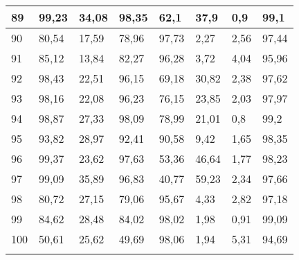 \begin{longtable}[c]{|l|l|l|l|l|l|l|l|}
89              & 99,23        & 34,08        & 98,35       & 62,1          & 37,9          & 0,9           & 99,1          \\ \hline
90              & 80,54        & 17,59        & 78,96       & 97,73         & 2,27          & 2,56          & 97,44         \\ \hline
91              & 85,12        & 13,84        & 82,27       & 96,28         & 3,72          & 4,04          & 95,96         \\ \hline
92              & 98,43        & 22,51        & 96,15       & 69,18         & 30,82         & 2,38          & 97,62         \\ \hline
93              & 98,16        & 22,08        & 96,23       & 76,15         & 23,85         & 2,03          & 97,97         \\ \hline
94              & 98,87        & 27,33        & 98,09       & 78,99         & 21,01         & 0,8           & 99,2          \\ \hline
95              & 93,82        & 28,97        & 92,41       & 90,58         & 9,42          & 1,65          & 98,35         \\ \hline
96              & 99,37        & 23,62        & 97,63       & 53,36         & 46,64         & 1,77          & 98,23         \\ \hline
97              & 99,09        & 35,89        & 96,83       & 40,77         & 59,23         & 2,34          & 97,66         \\ \hline
98              & 80,72        & 27,15        & 79,06       & 95,67         & 4,33          & 2,82          & 97,18         \\ \hline
99              & 84,62        & 28,48        & 84,02       & 98,02         & 1,98          & 0,91          & 99,09         \\ \hline
100             & 50,61        & 25,62        & 49,69       & 98,06         & 1,94          & 5,31          & 94,69         \\ \hline
\label{anx:varianza}
\end{longtable}
